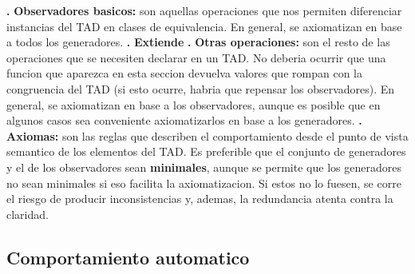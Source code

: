 \documentclass[10pt,a4paper]{article}
\begin{document}
\newline
\newline
\textbf{.} \textbf{Observadores basicos:} son aquellas operaciones que nos permiten diferenciar instancias del TAD en clases de equivalencia. En general, se axiomatizan en base a todos los generadores.
\newline
\newline
\textbf{.} \textbf{Extiende}
\newline
\newline
\textbf{.} \textbf{Otras operaciones:} son el resto de las operaciones que se necesiten declarar en un TAD. No deberia ocurrir que una funcion que aparezca en esta seccion devuelva valores que rompan con la congruencia del TAD (si esto ocurre, habria que repensar los observadores). En general, se axiomatizan en base a los observadores, aunque es posible que en algunos casos sea conveniente axiomatizarlos en base a los generadores. 
\newline
\newline
\textbf{.} \textbf{Axiomas:} son las reglas que describen el comportamiento desde el punto de vista semantico de los elementos del TAD. 
\newline
\newline
Es preferible que el conjunto de generadores y el de los observadores sean \textbf{minimales}, aunque se permite que los generadores no sean minimales si eso facilita la axiomatizacion. Si estos no lo fuesen, se corre el riesgo de producir inconsistencias y, ademas, la redundancia atenta contra la claridad.

\subsection{Comportamiento automatico}
\end{document}
